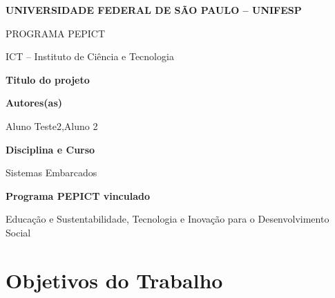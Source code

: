 \documentclass[12pt,a4paper]{article}
\begin{document}

\begin{center}

{\large \textbf{UNIVERSIDADE FEDERAL DE SÃO PAULO -- UNIFESP}}

\vspace{0.3cm}

{\normalsize PROGRAMA PEPICT}

\vspace{0.3cm}

{\normalsize ICT -- Instituto de Ciência e Tecnologia}

\vspace{1cm}

{\Large \textbf{Titulo do projeto}}

\end{center}

\vspace{1cm}


\noindent
\textbf{Autores(as)}

Aluno Teste2,Aluno 2

\vspace{0.7cm}


\noindent
\textbf{Disciplina e Curso}

Sistemas Embarcados

\vspace{0.7cm}


\noindent
\textbf{Programa PEPICT vinculado}

Educação e Sustentabilidade, Tecnologia e Inovação para o Desenvolvimento Social

\vspace{0.7cm}


\section*{Objetivos do Trabalho}
\end{document}

